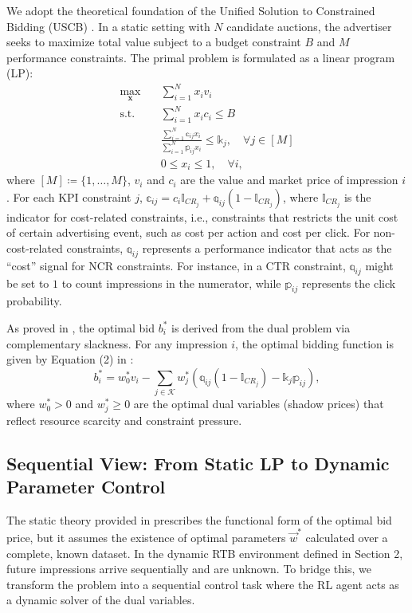 \documentclass[sigconf, anonymous, review]{acmart}
\begin{document}
We adopt the theoretical foundation of the Unified Solution to Constrained Bidding (USCB) \cite{UnifiedSol}.
In a static setting with $N$ candidate auctions, the advertiser seeks to maximize total value subject to a budget constraint $B$ and $M$ performance constraints.
The primal problem is formulated as a linear program (LP):
\begin{equation}
\begin{aligned}
    \max_{\mathbf{x}} \quad & \sum_{i=1}^N x_i v_i \\
    \text{s.t.} \quad & \sum_{i=1}^N x_i c_i \le B \\
    & \frac{\sum_{i=1}^N \mathbb{c}_{ij} x_i}{\sum_{i=1}^N \mathbb{p}_{ij} x_i} \le \mathbb{k}_j, \quad \forall j \in [M] \\
    & 0 \le x_i \le 1, \quad \forall i,
\end{aligned}
\end{equation}
where $[M]\coloneqq\{1,\ldots,M\}$, $v_i$ and $c_i$ are the value and market price of impression $i$.
For each KPI constraint $j$, $\mathbb{c}_{ij} = c_i \mathbb{I}_{CR_j} + \mathbb{q}_{ij} (1 - \mathbb{I}_{CR_j})$, where $\mathbb{I}_{CR_j}$ is the indicator for cost-related constraints, i.e., constraints that restricts the unit cost of certain advertising event, such as cost per action and cost per click. For non-cost-related constraints, $\mathbb{q}_{ij}$ represents a performance indicator that acts as the ``cost'' signal for NCR constraints.
For instance, in a CTR constraint, $\mathbb{q}_{ij}$ might be set to $1$ to count impressions in the numerator, while $\mathbb{p}_{ij}$ represents the click probability.

As proved in \cite{UnifiedSol}, the optimal bid $b_i^*$ is derived from the dual problem via complementary slackness. For any impression $i$, the optimal bidding function is given by Equation (2) in \cite{UnifiedSol}:
\begin{equation}
\label{eq:uscb_formula_appendix}
    b_{i}^{*}=w_{0}^{*}v_{i}-\sum_{j \in \mathcal{K}}w_{j}^{*}(\mathbb{q}_{ij}(1-\mathbb{I}_{CR_{j}})-\mathbb{k}_{j}\mathbb{p}_{ij}),
\end{equation}
where $w_{0}^{*}>0$ and $w_{j}^{*}\ge0$ are the optimal dual variables (shadow prices) that reflect resource scarcity and constraint pressure.

\subsection{Sequential View: From Static LP to Dynamic Parameter Control}
\label{app:seq_view}
The static theory provided in \cite{UnifiedSol} prescribes the functional form of the optimal bid price, but it assumes the existence of optimal parameters $\vec{w}^*$ calculated over a complete, known dataset. In the dynamic RTB environment defined in Section 2, future impressions arrive sequentially and are unknown. To bridge this, we transform the problem into a sequential control task where the RL agent acts as a dynamic solver of the dual variables.
\end{document}
